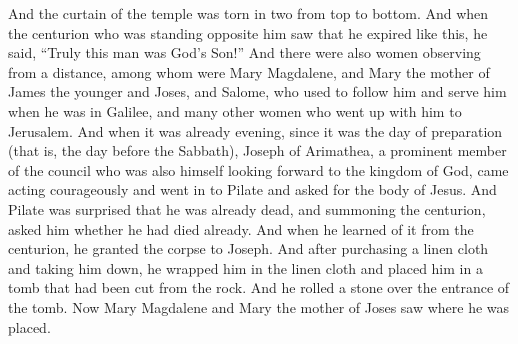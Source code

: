 \begin{biblechapter}
\verse And the curtain of the temple was torn in two from top to bottom.
\verse And when the centurion who was standing opposite him saw that he expired like this, he said, “Truly this man was God’s Son!”
\verse And there were also women observing from a distance, among whom were Mary Magdalene, and Mary the mother of James the younger and Joses, and Salome,
\verse who used to follow him and serve him when he was in Galilee, and many other women who went up with him to Jerusalem.
 And when it was already evening, since it was the day of preparation (that is, the day before the Sabbath),
\verse Joseph of Arimathea, a prominent member of the council who was also himself looking forward to the kingdom of God, came acting courageously and went in to Pilate and asked for the body of Jesus.
\verse And Pilate was surprised that he was already dead, and summoning the centurion, asked him whether he had died already.
\verse And when he learned of it from the centurion, he granted the corpse to Joseph.
\verse And after purchasing a linen cloth and taking him down, he wrapped him in the linen cloth and placed him in a tomb that had been cut from the rock. And he rolled a stone over the entrance of the tomb.
\verse Now Mary Magdalene and Mary the mother of Joses saw where he was placed.
\end{biblechapter}

